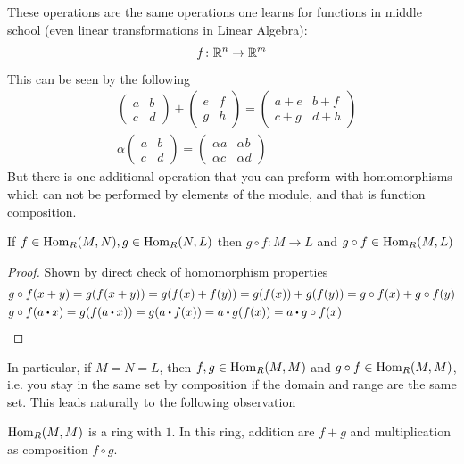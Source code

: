 \documentclass[../Main.tex]{subfiles}
\begin{document}
\newpage
\Note These operations are the same operations one learns for functions in middle school (even linear transformations in Linear Algebra):
\[f\colon \mathbb{R}^n \to \mathbb{R}^m\]
This can be seen by the following
\begin{align*}
&\begin{pmatrix}
a&b\\
c&d
\end{pmatrix} + \begin{pmatrix}
e&f\\
g&h
\end{pmatrix} = \begin{pmatrix}
a+e&b+f\\
c+g&d+h
\end{pmatrix}\\
&\alpha \begin{pmatrix}
a&b\\
c&d
\end{pmatrix} = \begin{pmatrix}
\alpha a&\alpha b\\
\alpha c&\alpha d
\end{pmatrix}
\end{align*}
But there is one additional operation that you can preform with homomorphisms which can not be performed by elements of the module, and that is function composition.
\begin{prop}
	If $f\in \operatorname{Hom}_R(M,N), g \in \operatorname{Hom}_R(N,L)$ then $g\circ f \colon M\to L$ and $g\circ f \in \operatorname{Hom}_R(M,L)$
\end{prop}
\begin{proof}
	Shown by direct check of homomorphism properties
	\begin{align*}
	&g\circ f(x+y) = g(f(x+y)) = g(f(x)+f(y)) = g(f(x)) +g(f(y)) =g\circ f(x) + g\circ f(y)\\
	&g\circ f(a\rdot x) = g(f(a\rdot x)) = g(a\rdot f(x)) = a\rdot g(f(x))=a\rdot g\circ f(x) \qedhere
	\end{align*}
\end{proof}
In particular, if $M=N=L$, then $f,g \in \operatorname{Hom}_R(M,M)$ and $g\circ f \in \operatorname{Hom}_R(M,M)$, i.e. you stay in the same set by composition if the domain and range are the same set. This leads naturally to the following observation
\begin{crl}[title=\texorpdfstring{$\Hom_R(M,M)$}{Hom} is a ring]
	$\Hom_R(M,M)$ is a ring with $1$. In this ring, addition are $f+g$ and multiplication as composition $f\circ g$.
\end{crl}
\end{document}
